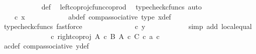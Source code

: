 \begin{isabellebody}
\ \ \ \ \ \ \ \ \ \ \isamarkupfalse%
\ {\isasymphi}{\isacharunderscore}{\kern0pt}def\ \isamarkupfalse%
\ left{\isacharunderscore}{\kern0pt}coproj{\isacharunderscore}{\kern0pt}cfunc{\isacharunderscore}{\kern0pt}coprod\ \isamarkupfalse%
\ {\isacharparenleft}{\kern0pt}typecheck{\isacharunderscore}{\kern0pt}cfuncs{\isacharcomma}{\kern0pt}\ auto{\isacharparenright}{\kern0pt}\isanewline
\ \ \ \ \ \ \ \ \isamarkupfalse%
\ \isamarkupfalse%
\ {\isachardoublequoteopen}{\isachardot}{\kern0pt}{\isachardot}{\kern0pt}{\isachardot}{\kern0pt}\ {\isacharequal}{\kern0pt}\ {\isasymphi}\ {\isasymcirc}\isactrlsub c\ x{\isachardoublequoteclose}\isanewline
\ \ \ \ \ \ \ \ \ \ \isamarkupfalse%
\ ab{\isacharunderscore}{\kern0pt}def\ comp{\isacharunderscore}{\kern0pt}associative{}\ {\isasymphi}{\isacharunderscore}{\kern0pt}type\ x{\isacharprime}{\kern0pt}{\isacharunderscore}{\kern0pt}def\ \isamarkupfalse%
\ {\isacharparenleft}{\kern0pt}typecheck{\isacharunderscore}{\kern0pt}cfuncs{\isacharcomma}{\kern0pt}\ fastforce{\isacharparenright}{\kern0pt}\isanewline
\ \ \ \ \ \ \ \ \isamarkupfalse%
\ \isamarkupfalse%
\ {\isachardoublequoteopen}{\isachardot}{\kern0pt}{\isachardot}{\kern0pt}{\isachardot}{\kern0pt}\ {\isacharequal}{\kern0pt}\ {\isasymphi}\ {\isasymcirc}\isactrlsub c\ y{\isachardoublequoteclose}\isanewline
\ \ \ \ \ \ \ \ \ \ \isamarkupfalse%
\ {\isacharparenleft}{\kern0pt}simp\ add{\isacharcolon}{\kern0pt}\ local{\isachardot}{\kern0pt}equal{\isacharparenright}{\kern0pt}\isanewline
\ \ \ \ \ \ \ \ \isamarkupfalse%
\ \isamarkupfalse%
\ {\isachardoublequoteopen}{\isachardot}{\kern0pt}{\isachardot}{\kern0pt}{\isachardot}{\kern0pt}\ {\isacharequal}{\kern0pt}\ {\isacharparenleft}{\kern0pt}{\isasymphi}\ {\isasymcirc}\isactrlsub c\ right{\isacharunderscore}{\kern0pt}coproj\ {\isacharparenleft}{\kern0pt}A\ {\isasymtimes}\isactrlsub c\ B{\isacharparenright}{\kern0pt}\ {\isacharparenleft}{\kern0pt}A\ {\isasymtimes}\isactrlsub c\ C{\isacharparenright}{\kern0pt}{\isacharparenright}{\kern0pt}\ {\isasymcirc}\isactrlsub c\ {\isasymlangle}a{\isacharprime}{\kern0pt}{\isacharcomma}{\kern0pt}\ c{\isacharprime}{\kern0pt}{\isasymrangle}{\isachardoublequoteclose}\isanewline
\ \ \ \ \ \ \ \ \ \ \isamarkupfalse%
\ a{\isacharprime}{\kern0pt}c{\isacharprime}{\kern0pt}{\isacharunderscore}{\kern0pt}def\ comp{\isacharunderscore}{\kern0pt}associative{}\ y{\isacharprime}{\kern0pt}{\isacharunderscore}{\kern0pt}def\ \isamarkupfalse%

\end{isabellebody}
